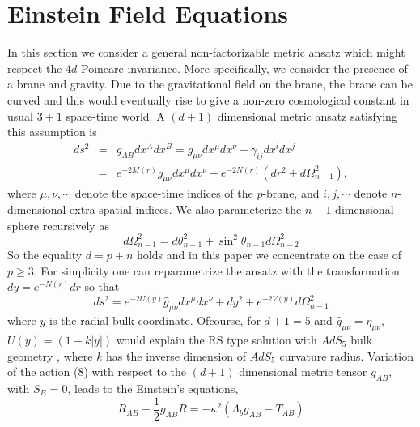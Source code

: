 \documentclass[a4paper,12pt]{article}
\newcommand {\nn} {\nonumber}
\begin{document}
\section{Einstein Field Equations}   
   In this section we  consider a general non-factorizable metric ansatz 
which might respect the $4d$ Poincare invariance. More specifically, we 
consider the presence of a brane and gravity. Due to the gravitational 
field on the brane, the brane can be curved and this would eventually 
rise to give a non-zero cosmological constant in usual $3+1$ space-time 
world. A $(d+1)$ dimensional metric ansatz satisfying this 
assumption is
\begin{eqnarray}
ds^2 &=& g_{AB} dx^A dx^B 
= g_{\mu\nu} dx^\mu dx^\nu +\gamma_{ij} dx^i dx^j\nn\\
&=& e^{-2M(r)}\hat{g}_{\mu\nu}dx^\mu dx^\nu + e^{-2N(r)} (dr^2 
+ d \Omega_{n-1}^2),
\end{eqnarray} 
where $\mu, \nu,\cdots$ denote the space-time indices of 
the $p$-brane, and $i,j,\cdots$ denote $n$-dimensional extra spatial 
indices. We also parameterize the $n-1$ dimensional sphere 
recursively as
\begin{equation}
d\Omega_{n-1}^2 = d\theta_{n-1}^2 + \sin^2 \theta_{n-1} d\Omega_{n-2}^2  
\end{equation}
So the equality $d=p+n$ holds and in this paper we concentrate on 
the case of $p\geq 3$. For simplicity one can reparametrize the ansatz
with the transformation $dy=e^{-N(r)} dr$ so that 
\begin{equation}
ds^2= e^{-2U(y)}\hat{g}_{\mu\nu}dx^\mu dx^\nu + dy^2 
+ e^{-2V(y)} d \Omega_{n-1}^2
\end{equation}
where $y$ is the radial bulk coordinate. Ofcourse, for $d+1=5$ and 
$\hat{g}_{\mu\nu}=\eta_{\mu\nu}$, $U(y)=(1+ k|y|)$ would explain the 
RS type solution with $AdS_5$ bulk geometry , where $k$ has the inverse 
dimension of $AdS_5$ curvature radius.
Variation of the action (8) with respect to the $(d+1)$ dimensional
metric tensor $g_{AB}$, with $S_B=0$, leads to the Einstein's equations,
\begin{equation}
R_{AB}-\frac{1}{2}g_{AB}R=-\kappa^2\left(\Lambda_b g_{AB}-T_{AB}\right)
\end{equation}
\end{document}
